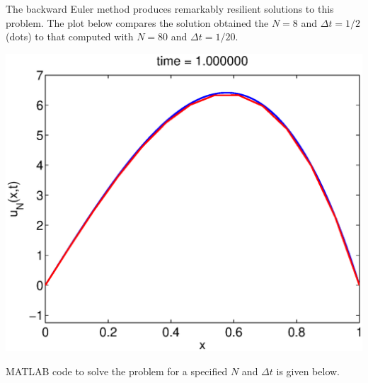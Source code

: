 {\begin{solution}
\begin{enumerate}
      The backward Euler method produces remarkably resilient solutions
      to this problem.
      The plot below compares the solution obtained the $N=8$ 
      and $\Delta t = 1/2$ (dots) to that
      computed with $N=80$ and $\Delta t = 1/20$.

\begin{center}
\includegraphics[scale=0.6]{femex1sol.eps}
\end{center}

     MATLAB code to solve the problem for a specified $N$ and $\Delta t$
     is given below.


\end{enumerate}
\end{solution}}{}